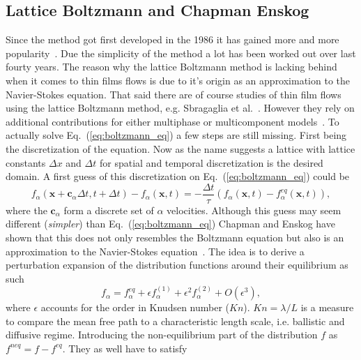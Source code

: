 \subsection{Lattice Boltzmann and Chapman Enskog}
Since the method got first developed in the 1986 it has gained more and more popularity~\cite{PhysRevLett.56.1505}.
Due the simplicity of the method a lot has been worked out over last fourty years.
The reason why the lattice Boltzmann method is lacking behind when it comes to thin films flows is due to it's origin as an approximation to the Navier-Stokes equation.
That said there are of course studies of thin film flows using the lattice Boltzmann method, e.g. Sbragaglia et al.~\cite{Sbragaglia}.
However they rely on additional contributions for either multiphase or multicomponent models~\cite{shan1993lattice, shan_yuan_chen_2006, CHEN1995617}.
To actually solve Eq.~(\ref{eq:boltzmann_eq}) a few steps are still missing.
First being the discretization of the equation.
Now as the name suggests a lattice with lattice constants $\Delta x$ and $\Delta t$ for spatial and temporal discretization is the desired domain.
A first guess of this discretization on Eq.~(\ref{eq:boltzmann_eq}) could be
\begin{equation}\label{eq:LBM_discret_noforces}
    f_{\alpha}(\mathbf{x}+\mathbf{c}_{\alpha}\Delta t, t+ \Delta t) - f_{\alpha}(\mathbf{x}, t) = -\frac{\Delta t}{\tau}(f_{\alpha}(\mathbf{x}, t) - f^{eq}_{\alpha}(\mathbf{x}, t)),
\end{equation}
where the $\mathbf{c}_{\alpha}$ form a discrete set of $\alpha$ velocities.
Although this guess may seem different (\textit{simpler}) than Eq.~(\ref{eq:boltzmann_eq}) Chapman and Enskog have shown that this does not only resembles the Boltzmann equation but also is an approximation to the Navier-Stokes equation~\cite{chapmanMathematicalTheoryNonuniform1990, enskogKinetischeTheorieVorgange1917}. 
The idea is to derive a perturbation expansion of the distribution functions around their equilibrium as such
\begin{equation}\label{eq:expansion_f}
    f_{\alpha} = f_{\alpha}^{eq} + \epsilon f_{\alpha}^{(1)} + \epsilon^2 f_{\alpha}^{(2)} + O(\epsilon^3), 
\end{equation}
where $\epsilon$ accounts for the order in Knudsen number ($Kn$). 
$Kn = \lambda/L$ is a measure to compare the mean free path to a characteristic length scale, i.e. ballistic and diffusive regime.
Introducing the non-equilibrium part of the distribution $f$ as $f^{neq} = f - f^{eq}$. 
They as well have to satisfy 
